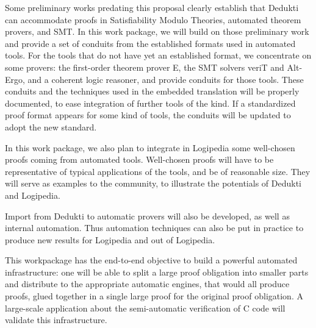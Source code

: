 \begin{workpackage}
\begin{wpdescription}
Some preliminary works predating this proposal clearly establish that
Dedukti can accommodate proofs in Satisfiability Modulo Theories,
automated theorem provers, and SMT. In this work package, we will build
on those preliminary work and provide a set of conduits from the
established formats used in automated tools. For the tools that do not
have yet an established format, we concentrate on some provers: the
first-order theorem prover E, the SMT solvers veriT and Alt-Ergo, and a
coherent logic reasoner, and provide conduits for those tools. These
conduits and the techniques used in the embedded translation will be
properly documented, to ease integration of further tools of the kind.
If a standardized proof format appears for some kind of tools, the
conduits will be updated to adopt the new standard.

In this work package, we also plan to integrate in Logipedia some well-chosen
proofs coming from automated tools.  Well-chosen proofs will have to be
representative of typical applications of the tools, and be of reasonable size.
They will serve as examples to the community, to illustrate the potentials of
Dedukti and Logipedia.

Import from Dedukti to automatic provers will also be developed, as well as
internal automation. Thus automation techniques can also be put in practice to
produce new results for Logipedia and out of Logipedia.

This workpackage has the end-to-end objective to build a powerful automated
infrastructure: one will be able to split a large proof obligation into smaller
parts and distribute to the appropriate automatic engines, that would all
produce proofs, glued together in a single large proof for the original proof
obligation. A large-scale application about the semi-automatic verification of C
code will validate this infrastructure.
\end{wpdescription}


\begin{tasklist}
  \begin{task}[id=instrumenting,
      title=Instrumenting ATPs to produce traces,
      lead=Lie,
      LieRM=28,
      ImtRM=1,
      OcaRM=12,
      BelRM=6,
    ]


\end{task}
\end{tasklist}
\end{workpackage}
